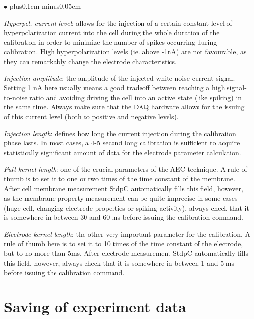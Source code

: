 \documentclass{article}
\newenvironment{myitem}{\begin{list}{$\bullet$}{\setlength{\leftmargin}{1.1em}
\itemsep0.1cm plus0.1cm minus0.05cm
\listparindent0cm
\addtolength{\labelsep}{0.5\labelsep}
\setlength{\labelwidth}{0.8em}
\setlength{\leftmargin}{\labelwidth}
\addtolength{\leftmargin}{\labelsep}
}}{\end{list}}
\begin{document}
\begin{myitem}
\item \emph{Hyperpol. current level}: allows for the injection of a certain
  constant level of  hyperpolarization current into the cell during the
  whole duration of the calibration in order to minimize the number of
  spikes occurring during calibration. High hyperpolarization levels
  (ie. above -1nA) are not favourable, as they can remarkably change the electrode 
  characteristics.
\item \emph{Injection amplitude}: the amplitude of the injected
  white noise current signal. Setting 1 nA here usually means a good
  tradeoff between reaching a high signal-to-noise ratio and avoiding
  driving the cell into 
  an active state (like spiking) in the same time. Always make sure that
  the DAQ hardware allows for the issuing of this current level (both to
  positive and negative levels).
\item \emph{Injection length}: defines how long the current injection during
  the calibration phase lasts. In most cases, a 4-5 second long calibration
  is sufficient to acquire statistically significant amount of data for the
  electrode parameter calculation.   
\item \emph{Full kernel length}: one of the crucial parameters of the AEC
  technique. A rule of thumb is to set it to one or two times of the time constant of
  the membrane. After cell membrane measurement StdpC automatically
  fills this field, however, as the membrane property measurement can be
  quite imprecise in some cases (huge cell, changing electrode properties
  or spiking activity), always check that it is somewhere in between 30 and
  60 ms before issuing the calibration command.
\item \emph{Electrode kernel length}: the other very important parameter for
  the calibration. A rule of thumb here is to set it to 10 times of the
  time constant of the electrode, but to no more than 5ms. After electrode
  measurement StdpC automatically fills this field, however, always
  check that it is somewhere in between 1 and 5 ms before issuing the
  calibration command.
\end{myitem}



\section{Saving of experiment data} \label{datasaving}
\end{document}
